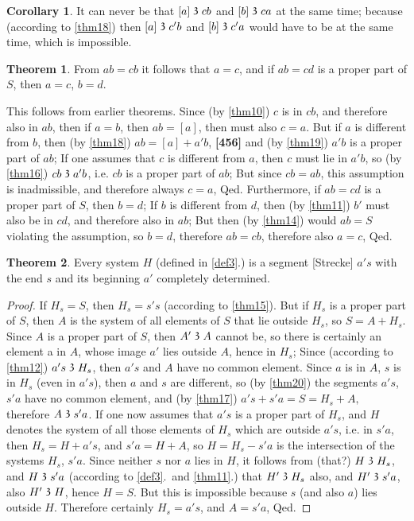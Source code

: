 \documentclass[leqno, hidelinks]{article}
\theoremstyle{definition}
\newtheorem{theorem}{Theorem}
\newtheorem*{corollary}{Corollary}
\newcommand\partof{\mathrel{\raisebox{0.45ex}{$\mathfrak{3}$}}}
\begin{document}
\begin{corollary}
It can never be that $[a] \partof cb$ and $[b] \partof ca$ at the same time; because (according to \ref{thm18}) then $[a] \partof c'b$ and $[b] \partof c'a$ would have to be at the same time, which is impossible.
\end{corollary}
\begin{theorem}\label{thm26}
From $ab=cb$ it follows that $a=c$, and if $ab=cd$ is a proper part of $S$, then $a=c$, $b = d$.
\end{theorem}

This follows from earlier theorems.
Since (by \ref{thm10}) $c$ is in $cb$, and therefore also in $ab$, then if $a=b$, then $ab = [a]$, then must also $c=a$.
But if $a$ is different from $b$, then (by \ref{thm18}) $ab = [a]+a'b$, \textbf{[456]} and (by \ref{thm19}) $a'b$ is a proper part of $ab$;
If one assumes that $c$ is different from $a$, then $c$ must lie in $a'b$, so (by \ref{thm16}) $cb \partof a'b$, i.e. $cb$ is a proper part of $ab$;
But since $cb=ab$, this assumption is inadmissible, and therefore always $c=a$, Qed.
Furthermore, if $ab=cd$ is a proper part of $S$, then $b=d$; If $b$ is different from $d$, then (by \ref{thm11}) $b'$ must also be in $cd$, and therefore also in $ab$; But then (by \ref{thm14}) would $ab = S$ violating the assumption, so $b=d$, therefore $ab=cb$, therefore also $a=c$, Qed.

\begin{theorem}\label{thm27}
Every system $H$ (defined in \ref{def3}.) is a segment [Strecke] $a's$ with the end $s$ and its beginning $a'$ completely determined.
\end{theorem}
\begin{proof}
If $H_s= S$, then $H_s= s's$ (according to \ref{thm15}).
But if $H_s$ is a proper part of $S$, then $A$ is the system of all elements of $S$ that lie outside $H_s$, so $S=A+H_s$.
Since $A$ is a proper part of $S$, then $A' \partof A$ cannot be, so there is certainly an element a in $A$, whose image $a'$ lies outside $A$, hence in $H_s$;
Since (according to \ref{thm12}) $a's \partof H_s$, then $a's$ and $A$ have no common element.
Since $a$ is in $A$, $s$ is in $H_s$ (even in $a's$), then $a$ and $s$ are different, so (by \ref{thm20}) the segments $a's$, $s'a$ have no common element, and (by \ref{thm17}) $a's+  s'a=S=H_s+ A,$ therefore $A \partof s'a$.
If one now assumes that $a's$ is a proper part of $H_s$, and $H$ denotes the system of all those elements of $H_s$ which are outside $a's$, i.e. in $s'a$, then $H_s = H+a's$, and $s'a = H + A$, so $H=H_s-s'a$ is the intersection of the systems $H_s$, $s'a$.
Since neither $s$ nor $a$ lies in $H$, it follows from (that?) $H \partof H_s$, and $H \partof s'a$ (according to \ref{def3}.\ and \ref{thm11}.) that $H' \partof H_s$ also, and $H' \partof s'a$, also $H' \partof H$, hence $H=S$.
But this is impossible because $s$ (and also $a$) lies outside $H$. Therefore certainly $H_s= a's$, and $A=s'a$, Qed.
\end{proof}
\end{document}

